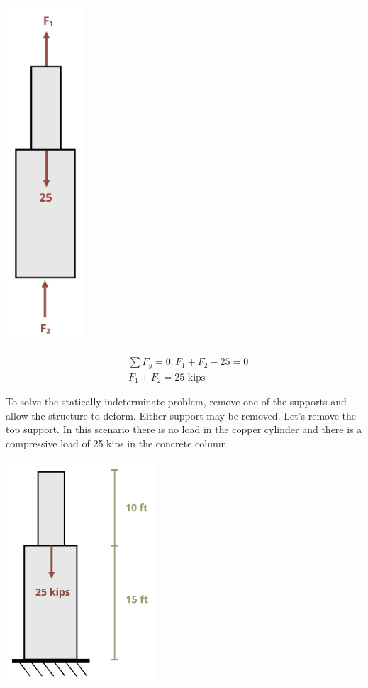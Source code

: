 \documentclass[
  letterpaper,
  DIV=11,
  numbers=noendperiod]{scrreprt}
\begin{document}
\begin{tcolorbox}
\begin{tcolorbox}
\begin{center}
\includegraphics[width=1.15625in,height=\textheight]{images/PNGs/Example 5.5 part 2.png}
\end{center}

\[
\begin{aligned}
&\sum F_y=0: F_1+F_2-25=0\\
&F_1+F_2=25 \text { kips }
\end{aligned}
\]

To solve the statically indeterminate problem, remove one of the
supports and allow the structure to deform. Either support may be
removed. Let's remove the top support. In this scenario there is no load
in the copper cylinder and there is a compressive load of 25 kips in the
concrete column.

\begin{center}
\includegraphics[width=2.1875in,height=\textheight]{images/PNGs/Example 5.5 part 3.png}
\end{center}


\end{tcolorbox}
\end{tcolorbox}
\end{document}
